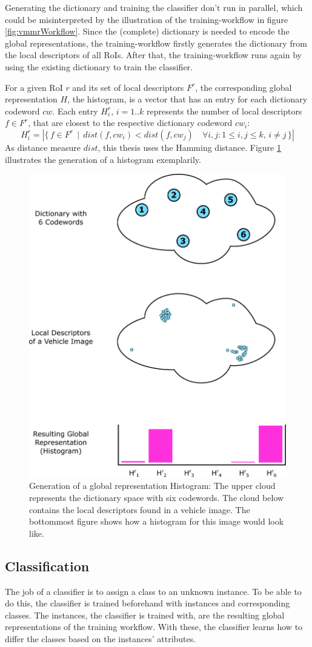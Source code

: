 Generating the dictionary and training the classifier don't run in parallel, which could be misinterpreted by the illustration of the training-workflow in figure \ref{fig:vmmrWorkflow}. Since the (complete) dictionary is needed to encode the global representations, the training-workflow firstly generates the dictionary from the local descriptors of all RoIs. After that, the training-workflow runs again by using the existing dictionary to train the classifier.

For a given RoI $r$ and its set of local descriptors $F^r$, the corresponding global representation $H$, the histogram, is a vector that has an entry for each dictionary codeword $cw$. Each entry $H_i^r,\,i = 1..k$ represents the number of local descriptors $f \in F^r$, that are closest to the respective dictionary codeword $cw_i$:
\begin{equation}
H_i^r = |\{\, f \in F^r \,\mid\, dist(f, cw_i) < dist(f, cw_j) \quad \forall i, j: 1 \le i, j \le k,\, i \ne j \,\}|
\end{equation}
As distance measure $dist$, this thesis uses the Hamming distance. Figure \ref{fig:histogram} illustrates the generation of a histogram exemplarily.

\begin{figure}[btph]
  \centering
        \includegraphics[width=.45\linewidth]{gfx/histogram}
        \caption{Generation of a global representation Histogram: The upper cloud represents the dictionary space with six codewords. The cloud below contains the local descriptors found in a vehicle image. The bottommost figure shows how a histogram for this image would look like.}
        \label{fig:histogram}
\end{figure}

\subsection{Classification}\label{sec:classificationConcept}
The job of a classifier is to assign a class to an unknown instance. To be able to do this, the classifier is trained beforehand with instances and corresponding classes. The instances, the classifier is trained with, are the resulting global representations of the training workflow. With these, the classifier learns how to differ the classes based on the instances' attributes.

